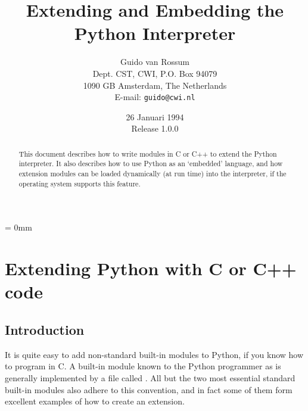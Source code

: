 
\title{Extending and Embedding the Python Interpreter}

\author{
	Guido van Rossum \\
	Dept. CST, CWI, P.O. Box 94079 \\
	1090 GB Amsterdam, The Netherlands \\
	E-mail: {\tt guido@cwi.nl}
}

\date{26 Januari 1994 \\ Release 1.0.0} %

\makeindex




\maketitle

\begin{abstract}

\noindent
This document describes how to write modules in C or C++ to extend the
Python interpreter.  It also describes how to use Python as an
`embedded' language, and how extension modules can be loaded
dynamically (at run time) into the interpreter, if the operating
system supports this feature.

\end{abstract}

\pagebreak

{
\parskip = 0mm
\tableofcontents
}

\pagebreak



\chapter{Extending Python with C or C++ code}


\section{Introduction}

It is quite easy to add non-standard built-in modules to Python, if
you know how to program in C.  A built-in module known to the Python
programmer as  is generally implemented by a file called
.  All but the two most essential standard built-in
modules also adhere to this convention, and in fact some of them form
excellent examples of how to create an extension.

